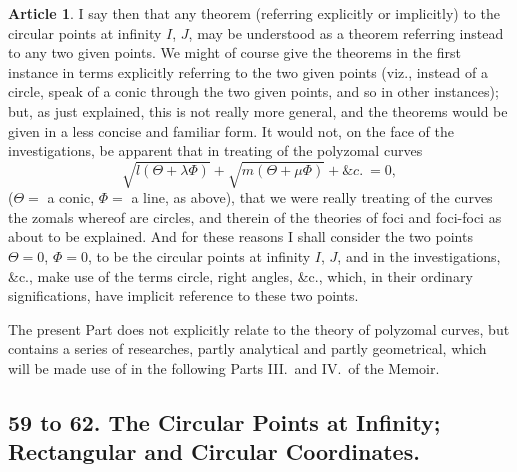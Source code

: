 \documentclass[11pt,a4paper]{article}
\theoremstyle{definition}
\newtheorem{art}{Article}
\begin{document}
\begin{art}
I say then that any theorem (referring explicitly or implicitly) to the circular points at infinity $I$, $J$, may be understood as a theorem referring instead to any two given points. We might of course give the theorems in the first instance in terms explicitly referring to the two given points (viz., instead of a circle, speak of a conic through the two given points, and so in other instances); but, as just explained, this is not really more general, and the theorems would be given in a less concise and familiar form. It would not, on the face of the investigations, be apparent that in treating of the polyzomal curves
\[
\sqrt{l(\Theta + \lambda\Phi)} + \sqrt{m(\Theta + \mu\Phi)} + \&c.\ = 0,
\]
($\Theta =$ a conic, $\Phi =$ a line, as above), that we were really treating of the curves the zomals whereof are circles, and therein of the theories of foci and foci-foci as about to be explained. And for these reasons I shall consider the two points $\Theta = 0$, $\Phi = 0$, to be the circular points at infinity $I$, $J$, and in the investigations, \&c., make use of the terms circle, right angles, \&c., which, in their ordinary significations, have implicit reference to these two points.

The present Part does not explicitly relate to the theory of polyzomal curves, but contains a series of researches, partly analytical and partly geometrical, which will be made use of in the following Parts III.\ and IV.\ of the Memoir.
\end{art}

\subsection*{59 to 62. The Circular Points at Infinity; Rectangular and Circular Coordinates.}
\end{document}
